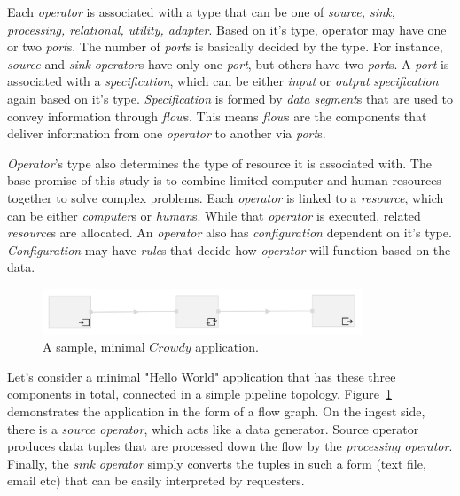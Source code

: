 Each \textit{operator} is associated with a type that can be one of \textit{source, sink, 
processing, relational, utility, adapter}. Based on it's type, operator may have 
one or two \textit{port}s. The number of \textit{port}s is basically decided by the type. 
For instance, \textit{source} and \textit{sink} \textit{operator}s have only one \textit{port}, 
but others have two \textit{port}s. A \textit{port} is associated with a \textit{specification}, 
which can be either \textit{input} or \textit{output} \textit{specification} again based on 
it's type. \textit{Specification} is formed by \textit{data segment}s that are used to 
convey information through \textit{flow}s. This means \textit{flow}s are the 
components that deliver information from one \textit{operator} to another via \textit{port}s.

\textit{Operator}'s type also determines the type of resource it is associated with. The base 
promise of this study is to combine limited computer and human resources together to 
solve complex problems. Each \textit{operator} is linked to a \textit{resource}, which can be either 
\textit{computer}s or \textit{human}s. While that \textit{operator} is executed, related \textit{resource}s are 
allocated. An \textit{operator} also has \textit{configuration} dependent on it's type. \textit{Configuration} 
may have \textit{rule}s that decide how \textit{operator} will function based on the data.

\begin{figure}[ht]
	\centering
	\includegraphics[width=0.85\textwidth]{figures/helloworld.png}
	\caption{A sample, minimal $Crowdy$ application.}
	\label{fig:hello world}
\end{figure}

Let's consider a minimal "Hello World" application that has these three components 
in total, connected in a simple pipeline topology. Figure~\ref{fig:hello world} demonstrates 
the application in the form of a flow graph. On the ingest side, there is a 
\textit{source operator}, which acts like a data generator. Source operator produces 
data tuples that are processed down the flow by the 
\textit{processing operator}. Finally, the \textit{sink operator} simply converts the tuples 
in such a form (text file, email etc) that can be easily interpreted by requesters.

